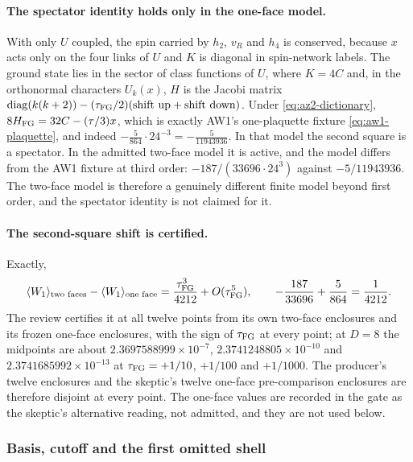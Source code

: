 \paragraph{The spectator identity holds only in the one-face model.}
With only $U$ coupled, the spin carried by $h_2$, $v_R$ and $h_4$ is
conserved, because $x$ acts only on the four links of $U$ and $K$ is diagonal
in spin-network labels. The ground state lies in the sector of class
functions of $U$, where $K=4C$ and, in the orthonormal characters $U_k(x)$,
$H$ is the Jacobi matrix $\mathrm{diag}(k(k+2))-(\tau_{\mathrm{FG}}/2)(\text{shift up}+
\text{shift down})$. Under \eqref{eq:az2-dictionary},
$8H_{\rm FG}=32C-(\tau/3)x$, which is exactly AW1's one-plaquette fixture
\eqref{eq:aw1-plaquette}, and indeed
$-\tfrac5{864}\cdot24^{-3}=-\tfrac5{11943936}$. In that model the second square
is a spectator. In the admitted two-face model it is active, and the model
differs from the AW1 fixture at third order: $-187/(33696\cdot24^3)$ against
$-5/11943936$. The two-face model is therefore a genuinely different finite
model beyond first order, and the spectator identity is not claimed for it.

\paragraph{The second-square shift is certified.}
Exactly,
\begin{equation}
 \langle W_1\rangle_{\text{two faces}}-\langle W_1\rangle_{\text{one face}}
 =\frac{\tau_{\mathrm{FG}}^3}{4212}+O(\tau_{\mathrm{FG}}^5),\qquad
 -\frac{187}{33696}+\frac5{864}=\frac1{4212}.
 \label{eq:az2-shift}
\end{equation}
The review certifies it at all twelve points from its own two-face
enclosures and its frozen one-face enclosures, with the sign of $\tau_{\mathrm{FG}}$ at
every point; at $D=8$ the midpoints are about $2.3697588999\times10^{-7}$,
$2.3741248805\times10^{-10}$ and $2.3741685992\times10^{-13}$ at
$\tau_{\mathrm{FG}}=+1/10$, $+1/100$ and $+1/1000$. The producer's twelve enclosures and the
skeptic's twelve one-face pre-comparison enclosures are therefore disjoint at
every point. The one-face values are recorded in the gate as the skeptic's
alternative reading, not admitted, and they are not used below.

\subsubsection{Basis, cutoff and the first omitted shell}
\label{sec:az2-basis}
